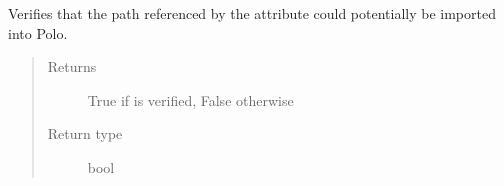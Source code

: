 \documentclass[letterpaper,10pt,english]{sphinxmanual}
\begin{document}
\begin{fulllineitems}

\begin{fulllineitems}
\label{\detokenize{polo.windows:polo.windows.run_importer.ImportCandidate.verify_path}}
Verifies that the path referenced by the {\hyperref[\detokenize{polo.windows:polo.windows.run_importer.ImportCandidate.path}]{}} attribute could
potentially be imported into Polo.
\begin{quote}\begin{description}
\item[{Returns}] \leavevmode
True if {\hyperref[\detokenize{polo.windows:polo.windows.run_importer.ImportCandidate.path}]{}} is verified, False otherwise

\item[{Return type}] \leavevmode
bool

\end{description}\end{quote}

\end{fulllineitems}


\end{fulllineitems}

\end{document}
